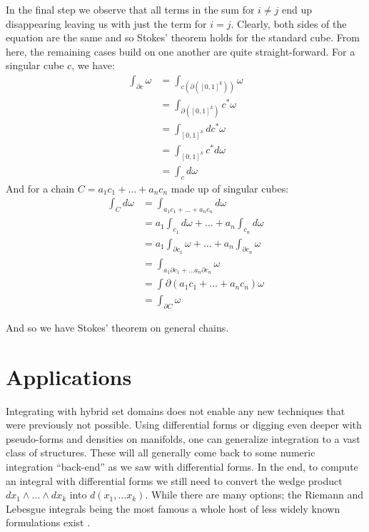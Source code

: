 In the final step we observe that all terms in the sum for $i \neq j$ end up disappearing leaving us with just the term for
$i=j$.
Clearly, both sides of the equation are the same and so Stokes' theorem holds for the standard cube.
From here, the remaining cases build on one another are quite straight-forward.
For a singular cube $c$, we have:
\begin{align*}
	\int_{\partial c} \omega
		&= \int_{c (\partial ([0,1]^k))} \omega \\
		&= \int_{\partial( [0,1]^k)} c^* \omega \\
		&= \int_{[0,1]^k} dc^* \omega \\
		&= \int_{[0,1]^k} c^* d \omega \\
		&= \int_c d\omega
\end{align*}
And for a chain $C=a_1 c_1 + \ldots + a_n c_n$ made up of singular cubes:
\begin{align*}
	\int_C d\omega 
		&= \int_{a_1c_1 + \ldots + a_nc_n	} d\omega \\
		&= a_1 \int_{c_1} d\omega + \ldots + a_n \int_{c_n} d\omega \\
		&= a_1 \int_{\partial c_1} \omega + \ldots + a_n \int_{\partial c_n} \omega \\
		&= \int_{a_1 \partial c_1 + \ldots a_n \partial c_n} \omega \\
		&= \int{\partial ( a_1c_1 + \ldots + a_n c_n)} \omega \\
		&= \int_{\partial C} \omega
\end{align*}

And so we have Stokes' theorem on general chains.




\section{Applications}

Integrating with hybrid set domains does not enable any new techniques that were previously not possible.
Using differential forms or digging even deeper with pseudo-forms and densities on manifolds, 
one can generalize integration to a vast class of structures.
These will all generally come back to some numeric integration ``back-end'' as we saw with differential forms.
In the end, to compute an integral with differential forms we still need to convert the wedge product
$dx_1 \wedge \ldots \wedge dx_k$ into $d(x_1, \ldots x_k)$.
While there are many options; the Riemann and Lebesgue integrals being the most famous  a whole host of 
less widely known formulations exist \cite{bochner1933integration, darboux1896leccons, henstock1991general}.


